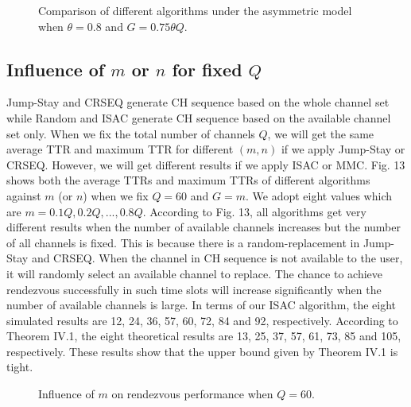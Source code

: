 \documentclass[journal]{IEEEtran}
\begin{document}
\begin{itemize}
\begin{figure}
\centering
{}
\hspace{1in}
\hspace{1in}
\hspace{1in}
\caption{Comparison of different algorithms under the asymmetric model when $\theta=0.8$ and $G=0.75\theta Q$.}
\end{figure}
\end{itemize}
\subsection{Influence of $m$ or $n$ for fixed $Q$}
Jump-Stay and CRSEQ generate CH sequence based on the whole channel set while Random and ISAC generate CH sequence based on the available channel set only. When we fix the total number of channels $Q$, we will get the same average TTR and maximum TTR for different $(m, n)$ if we apply Jump-Stay or CRSEQ. However, we will get different results if we apply ISAC or MMC. Fig. 13 shows both the average TTRs and maximum TTRs of different algorithms against $m$ (or $n$) when we fix $Q=60$ and $G=m$. We adopt eight values which are $m=0.1Q, 0.2Q, ..., 0.8Q$. According to Fig. 13, all algorithms get very different results when the number of available channels increases but the number of all channels is fixed. This is because there is a random-replacement in Jump-Stay and CRSEQ. When the channel in CH sequence is not available to the user, it will randomly select an available channel to replace. The chance to achieve rendezvous successfully in such time slots will increase significantly when the number of available channels is large. In terms of our ISAC algorithm, the eight simulated results are 12, 24, 36, 57, 60, 72, 84 and 92, respectively. According to Theorem IV.1, the eight theoretical results are 13, 25, 37, 57, 61, 73, 85 and 105, respectively. These results show that the upper bound given by Theorem IV.1 is tight.
\begin{figure}
\centering
{}
\hspace{1in}
\hspace{1in}
\hspace{1in}
\caption{Influence of $m$ on rendezvous performance when $Q=60$.}
\end{figure}
\end{document}
